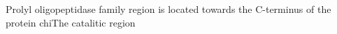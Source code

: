Prolyl oligopeptidase family region is located towards the C-terminus of the protein chiThe catalitic region 